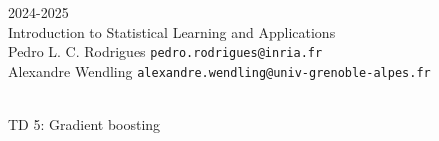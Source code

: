 \begin{flushleft}
 \hfill {} 2024-2025 \\
Introduction to Statistical Learning and Applications \\
Pedro L. C. Rodrigues   \hfill  \texttt{pedro.rodrigues@inria.fr} \\
Alexandre Wendling \hfill \texttt{alexandre.wendling@univ-grenoble-alpes.fr } \\

\HRuleTop\\
\begin{center}
\Large{TD 5: Gradient boosting}
\end{center}
\HRuleBottom
\end{flushleft}

